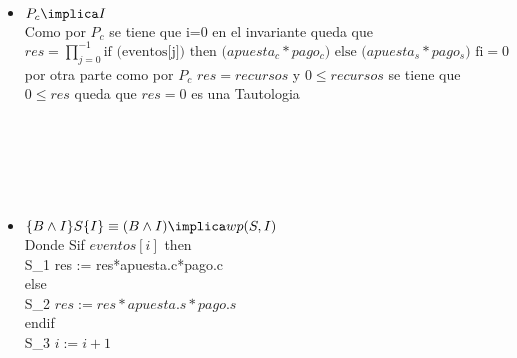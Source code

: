 \documentclass[10pt,a4paper]{article}
\begin{document}
\begin{itemize}
    \item $P_c \implica I$\\
     Como por $P_c$ se tiene que i=0 en el invariante queda que\\ $res = {\prod_{j=0}^{-1} \text{if (eventos[j]) then ($apuesta_c * pago_c$) else ($apuesta_s * pago_s$) fi}=0 }$ \\ por otra parte como por $P_c$ $res=recursos $ y $0\leq recursos$ se tiene que $0\leq res$ queda que $res=0$ es una Tautologia\\ \\ \\ \\ \\ \\
    \item $\{B \land I\} S \{I\} \equiv (B \land  I) \implica wp(S, I)$\\
    Donde S\equiv if\hspace{0.1cm} $eventos[i]$ \hspace{0.1cm}then\\
    S_1 \hspace{1cm} res := res*apuesta.c*pago.c\\ else\\S_2  \hspace{1cm} $res := res*apuesta.s*pago.s$\\endif\\S_3 
  \hspace{1cm} $i := i+1$ 
    

\end{itemize}
\end{document}
